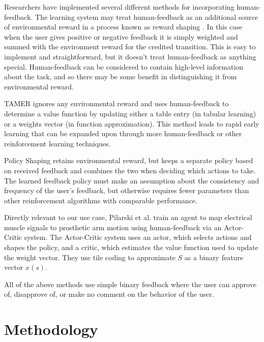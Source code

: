 \documentclass{article}
\begin{document}
Researchers have implemented several different methods for incorporating human-feedback. The learning system may treat human-feedback as an additional source of environmental reward in a process known as reward shaping \cite{ng_policy_1999}. In this case when the user gives positive or negative feedback it is simply weighted and summed with the environment reward for the credited transition. This is easy to implement and straightforward, but it doesn't treat human-feedback as anything special. Human-feedback can be considered to contain high-level information about the task, and so there may be some benefit in distinguishing it from environmental reward.

TAMER \cite{knox_tamer:_2008} ignores any environmental reward and uses human-feedback to determine a value function by updating either a table entry (in tabular learning) or a weights vector (in function approximation). This method leads to rapid early learning that can be expanded upon through more human-feedback or other reinforcement learning techniques.

Policy Shaping \cite{griffith_policy_2013} retains environmental reward, but keeps a separate policy based on received feedback and combines the two when deciding which actions to take. The learned feedback policy must make an assumption about the consistency and frequency of the user's feedback, but otherwise requires fewer parameters than other reinforcement algorithms with comparable performance. 

Directly relevant to our use case, Pilarski et al. \cite{pilarski_online_2011} train an agent to map electrical muscle signals to prosthetic arm motion using human-feedback via an Actor-Critic system. The Actor-Critic system uses an actor, which selects actions and shapes the policy, and a critic, which estimates the value function used to update the weight vector. They use tile coding to approximate $S$ as a binary feature vector $x(s)$. 

All of the above methods use simple binary feedback where the user can approve of, disapprove of, or make no comment on the behavior of the user. 

\section{Methodology}

\end{document}
